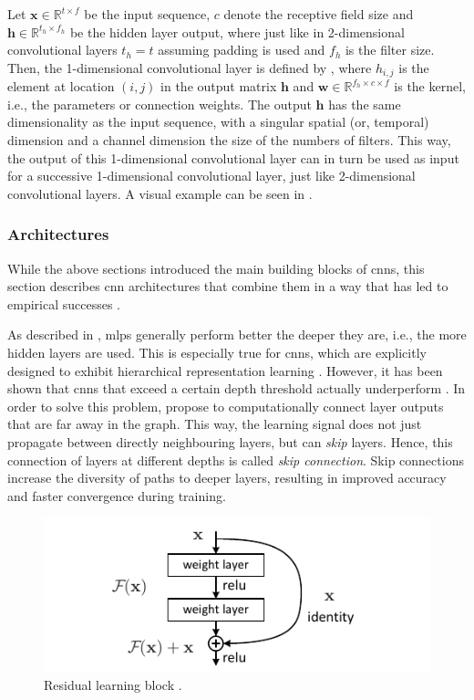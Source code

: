 Let $\mathbf{x}\in\mathbb{R}^{t\times f}$ be the input sequence, $c$ denote the receptive field size and $\mathbf{h}\in\mathbb{R}^{t_h\times f_h}$ be the hidden layer output, where just like in 2-dimensional convolutional layers $t_h=t$ assuming padding is used and $f_h$ is the filter size. Then, the 1-dimensional convolutional layer is defined by , where $h_{i,j}$ is the element at location $(i,j)$ in the output matrix $\mathbf{h}$ and $\mathbf{w}\in\mathbb{R}^{f_h\times c\times f}$ is the kernel, i.e., the parameters or connection weights. The output $\mathbf{h}$ has the same dimensionality as the input sequence, with a singular spatial (or, temporal) dimension and a channel dimension the size of the numbers of filters. This way, the output of this 1-dimensional convolutional layer can in turn be used as input for a successive 1-dimensional convolutional layer, just like 2-dimensional convolutional layers. A visual example can be seen in .

\subsubsection{Architectures}
\label{subsec:bg.cnn.arch}

While the above sections introduced the main building blocks of \glspl{cnn}, this section describes \gls{cnn} architectures that combine them in a way that has led to empirical successes \citep{ILSVRC15}.

As described in , \glspl{mlp} generally perform better the deeper they are, i.e., the more hidden layers are used. This is especially true for \glspl{cnn}, which are explicitly designed to exhibit hierarchical representation learning \citep{DBLP:journals/pr/FukushimaM82,DBLP:conf/cvpr/SzegedyLJSRAEVR15}. However, it has been shown that \glspl{cnn} that exceed a certain depth threshold actually underperform \citep{DBLP:conf/cvpr/HeZRS16}. In order to solve this problem, \citet{DBLP:conf/cvpr/HeZRS16,DBLP:conf/nips/SrivastavaGS15} propose to computationally connect layer outputs that are far away in the graph. This way, the learning signal does not just propagate between directly neighbouring layers, but can \emph{skip} layers. Hence, this connection of layers at different depths is called \emph{skip connection}. Skip connections increase the diversity of paths to deeper layers, resulting in improved accuracy and faster convergence during training.

\begin{figure}
    \centering
    \includegraphics{graphics/residual_block.pdf}
    \caption{Residual learning block \citep{DBLP:conf/cvpr/HeZRS16}.}
    \label{fig:residual_block}
\end{figure}

